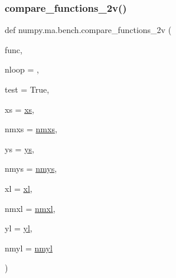 \subsubsection{\texorpdfstring{compare\+\_\+functions\+\_\+2v()}{compare\_functions\_2v()}}
{\footnotesize\ttfamily def numpy.\+ma.\+bench.\+compare\+\_\+functions\+\_\+2v (\begin{DoxyParamCaption}\item[{}]{func,  }\item[{}]{nloop = {},  }\item[{}]{test = {\ttfamily True},  }\item[{}]{xs = {\ttfamily \hyperlink{namespacenumpy_1_1ma_1_1bench_abbf981f32817a2dc4ec6406bf324035a}{xs}},  }\item[{}]{nmxs = {\ttfamily \hyperlink{namespacenumpy_1_1ma_1_1bench_ade94ef9dc31fe069bf5d359e7280e523}{nmxs}},  }\item[{}]{ys = {\ttfamily \hyperlink{namespacenumpy_1_1ma_1_1bench_a406865ea1ac13fac23e31d14de177579}{ys}},  }\item[{}]{nmys = {\ttfamily \hyperlink{namespacenumpy_1_1ma_1_1bench_afceae3eb4c0e9e3f6e80a6d7f15d414d}{nmys}},  }\item[{}]{xl = {\ttfamily \hyperlink{namespacenumpy_1_1ma_1_1bench_aa633d91568b1f05d8931d11d0732e618}{xl}},  }\item[{}]{nmxl = {\ttfamily \hyperlink{namespacenumpy_1_1ma_1_1bench_a8fcb5f226ee57f4211051c4f3103d7e7}{nmxl}},  }\item[{}]{yl = {\ttfamily \hyperlink{namespacenumpy_1_1ma_1_1bench_af4545282f92a9aeeb4535848320255c9}{yl}},  }\item[{}]{nmyl = {\ttfamily \hyperlink{namespacenumpy_1_1ma_1_1bench_a2d02f567c4898191b5f5ad23393220e8}{nmyl}} }\end{DoxyParamCaption})}

\mbox{\label{namespacenumpy_1_1ma_1_1bench_aab75d79acb6c71cd3b3c63af8bf31946}} 
